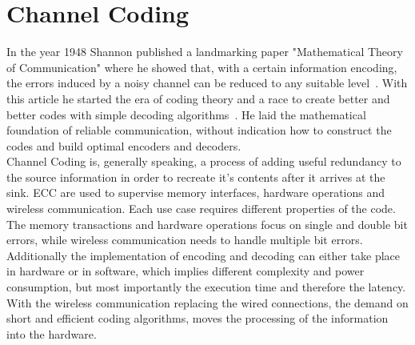 \section{Channel Coding} \label{sec:cod}
In the year 1948 Shannon published a landmarking paper "Mathematical Theory of Communication" where he showed that, with a certain information encoding, the errors induced by a noisy channel can be reduced to any suitable level~\cite{art:Shannon}. With this article he started the era of coding theory and a race to create better and better codes with simple decoding algorithms~\cite{book:Lint}. He laid the mathematical foundation of reliable communication, without indication how to construct the codes and build optimal encoders and decoders.\\
Channel Coding is, generally speaking, a process of adding useful redundancy to the source information in order to recreate it's contents after it arrives at the sink. ECC are used to supervise memory interfaces, hardware operations and wireless communication. Each use case requires different properties of the code. The memory transactions and hardware operations focus on single and double bit errors, while wireless communication needs to handle multiple bit errors. Additionally the implementation of encoding and decoding can either take place in hardware or in software, which implies different complexity and power consumption, but most importantly the execution time and therefore the latency. With the wireless communication replacing the wired connections, the demand on short and efficient coding algorithms, moves the processing of the information into the hardware. 
